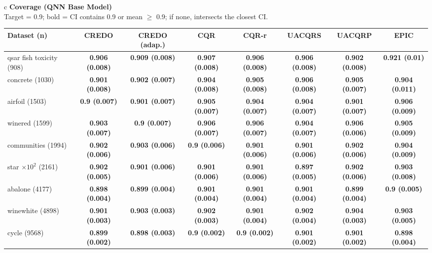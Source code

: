 \documentclass[border=6pt]{standalone}
\begin{document}
\begin{adjustbox}{max width=\linewidth}
\begin{tabular}{c}
{\small\textbf{Coverage (QNN Base Model)}}\\[-1pt]
{\scriptsize Target = 0.9; bold = CI contains 0.9 or mean $\geq$ 0.9; if none, intersects the closest CI.}\\[2pt]
\scriptsize\begin{tabular}{lccccccc}
\hline
Dataset (n) & \textbf{CREDO} & \textbf{CREDO (adap.)} & \textbf{CQR} & \textbf{CQR-r} & \textbf{UACQRS} & \textbf{UACQRP} & \textbf{EPIC}\\ \hline
qsar fish toxicity (908) & \textbf{0.906 (0.008)} & \textbf{0.909 (0.008)} & \textbf{0.907 (0.008)} & \textbf{0.906 (0.008)} & \textbf{0.906 (0.008)} & \textbf{0.902 (0.008)} & \textbf{0.921 (0.01)}\\
concrete (1030) & \textbf{0.901 (0.008)} & \textbf{0.902 (0.007)} & \textbf{0.904 (0.008)} & \textbf{0.905 (0.008)} & \textbf{0.906 (0.008)} & \textbf{0.905 (0.007)} & \textbf{0.904 (0.011)}\\
airfoil (1503) & \textbf{0.9 (0.007)} & \textbf{0.901 (0.007)} & \textbf{0.905 (0.007)} & \textbf{0.904 (0.007)} & \textbf{0.904 (0.007)} & \textbf{0.901 (0.007)} & \textbf{0.906 (0.009)}\\
winered (1599) & \textbf{0.903 (0.007)} & \textbf{0.9 (0.007)} & \textbf{0.906 (0.007)} & \textbf{0.906 (0.007)} & \textbf{0.904 (0.007)} & \textbf{0.906 (0.006)} & \textbf{0.905 (0.009)}\\
communities (1994) & \textbf{0.902 (0.006)} & \textbf{0.903 (0.006)} & \textbf{0.9 (0.006)} & \textbf{0.901 (0.006)} & \textbf{0.901 (0.006)} & \textbf{0.902 (0.006)} & \textbf{0.904 (0.009)}\\
star $\times 10^2$ (2161) & \textbf{0.902 (0.005)} & \textbf{0.901 (0.006)} & \textbf{0.901 (0.006)} & \textbf{0.901 (0.006)} & \textbf{0.897 (0.005)} & \textbf{0.902 (0.006)} & \textbf{0.903 (0.008)}\\
abalone (4177) & \textbf{0.898 (0.004)} & \textbf{0.899 (0.004)} & \textbf{0.901 (0.004)} & \textbf{0.901 (0.004)} & \textbf{0.901 (0.004)} & \textbf{0.899 (0.004)} & \textbf{0.9 (0.005)}\\
winewhite (4898) & \textbf{0.901 (0.003)} & \textbf{0.903 (0.003)} & \textbf{0.902 (0.003)} & \textbf{0.901 (0.004)} & \textbf{0.902 (0.004)} & \textbf{0.904 (0.003)} & \textbf{0.903 (0.005)}\\
cycle (9568) & \textbf{0.899 (0.002)} & \textbf{0.898 (0.003)} & \textbf{0.9 (0.002)} & \textbf{0.9 (0.002)} & \textbf{0.901 (0.002)} & \textbf{0.901 (0.002)} & \textbf{0.898 (0.004)}\\

\end{tabular}
\end{tabular}
\end{adjustbox}
\end{document}
